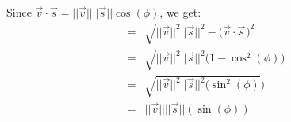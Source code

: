 \documentclass{article}
\begin{document}
Since $\vec{v} \cdot \vec{s} = ||\vec{v}||||\vec{s}||\cos(\phi)$, we get:
\begin{equation}
    \begin{aligned}
        = & \sqrt{||\vec{v}||^2||\vec{s}||^2 - (\vec{v} \cdot \vec{s}})^2 \\
        = & \sqrt{||\vec{v}||^2||\vec{s}||^2(1 - \cos^2(\phi)})           \\
        = & \sqrt{||\vec{v}||^2||\vec{s}||^2(\sin^2(\phi)})               \\
        = & ||\vec{v}||||\vec{s}||(\sin(\phi))                            \\
    \end{aligned}
\end{equation}
\end{document}
